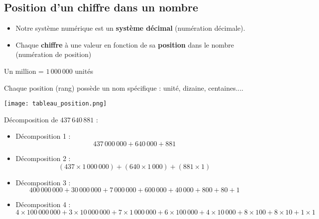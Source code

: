 \begin{pageCours}
\section{Position d'un chiffre dans un nombre}

\begin{Def}
\begin{itemize}
\item Notre système numérique est un \textbf{système décimal} (numération décimale).
\item Chaque \textbf{chiffre} à une valeur en fonction de sa \textbf{position} dans le nombre (numération de position)
\end{itemize}
\end{Def}

\begin{Ex}
Un million = $1\,000\,000$ unités
\end{Ex}

\begin{Voc}
Chaque position (rang) possède un nom spécifique : unité, dizaine, centaines....
    
\begin{center}
    \texttt{[image: tableau\_position.png]}
\end{center}
\end{Voc}

\begin{Mt}
Décomposition de $437\,640\,881$ :
\begin{itemize}
\item Décomposition 1 : 
\[437\,000\,000+640\,000+881\]
\item Décomposition 2 :
\[(437\times1\,000\,000)+(640\times 1\,000)+(881\times1)\]
\item Décomposition 3 :
\[400\,000\,000+30\,000\,000+7\,000\,000+600\,000+40\,000+800+80+1\]
\item Décomposition 4 :
\[4\times100\,000\,000+3\times10\,000\,000+7\times1\,000\,000+6\times100\,000+4\times10\,000+8\times100+8\times10+1\times1\]
\end{itemize}
\end{Mt}
\end{pageCours} 


